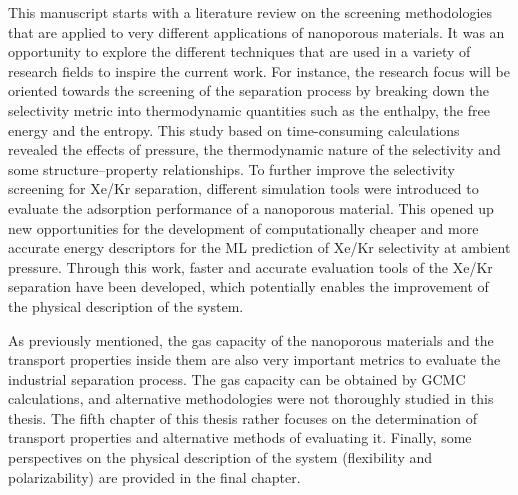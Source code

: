 This manuscript starts with a literature review on the screening methodologies that are applied to very different applications of nanoporous materials. It was an opportunity to explore the different techniques that are used in a variety of research fields to inspire the current work.\autocite{Ren_2022} For instance, the research focus will be oriented towards the screening of the separation process by breaking down the selectivity metric into thermodynamic quantities such as the enthalpy, the free energy and the entropy. This study based on time-consuming calculations revealed the effects of pressure, the thermodynamic nature of the selectivity and some structure--property relationships.\autocite{Ren_2021} To further improve the selectivity screening for Xe/Kr separation, different simulation tools were introduced to evaluate the adsorption performance of a nanoporous material.\autocite{Ren_2023} This opened up new opportunities for the development of computationally cheaper and more accurate energy descriptors for the ML prediction of Xe/Kr selectivity at ambient pressure.\autocite{Ren_2023_ml} Through this work, faster and accurate evaluation tools of the Xe/Kr separation have been developed, which potentially enables the improvement of the physical description of the system. 

As previously mentioned, the gas capacity of the nanoporous materials and the transport properties inside them are also very important metrics to evaluate the industrial separation process. The gas capacity can be obtained by GCMC calculations, and alternative methodologies were not thoroughly studied in this thesis. The fifth chapter of this thesis rather focuses on the determination of transport properties and alternative methods of evaluating it. Finally, some perspectives on the physical description of the system (flexibility and polarizability) are provided in the final chapter.


\vfill
\begin{center}
\end{center}
\vfill\vfill
